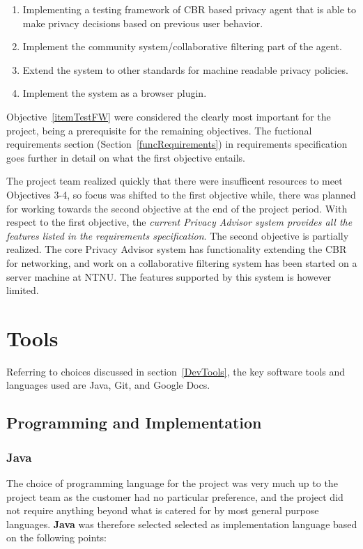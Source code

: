 \begin{enumerate}
\item\label{itemTestFW} Implementing a testing framework of CBR based privacy agent that is able to make privacy decisions based on previous user behavior.
\item\label{itemCollaborative} Implement the community system/collaborative filtering part of the agent.
\item\label{itemExtend} Extend the system to other standards for machine readable privacy policies.
\item\label{itemBrowser}Implement the system as a browser plugin. 
\end{enumerate}

Objective~\ref{itemTestFW} were considered the clearly most important for the project, being a prerequisite for the remaining objectives. The fuctional requirements section (Section~\ref{funcRequirements}) in requirements specification goes further in detail on what the first objective entails.

The project team realized quickly that there were insufficent resources to meet Objectives 3-4, so focus was shifted to the first objective while, there was planned for working towards the second objective at the end of the project period. With respect to the first objective, the \emph{current Privacy Advisor system provides all the features listed in the requirements specification}. The second objective is partially realized. The core Privacy Advisor system has functionality extending the CBR for networking, and work on a collaborative filtering system has been started on a server machine at NTNU. The features supported by this system is however limited.



\section{Tools}\label{toolseval}

Referring to choices discussed in section~\ref{DevTools}, the key
software tools and languages used are Java, Git, and Google
Docs. 

\subsection{Programming and Implementation}

\subsubsection{Java}
The choice of programming language for the project was very much up to the
project team as the customer had no particular preference, and the
project did not require anything beyond what is catered for by most
general purpose languages. \textbf{Java} was therefore selected 
selected as implementation language based on the following points:

